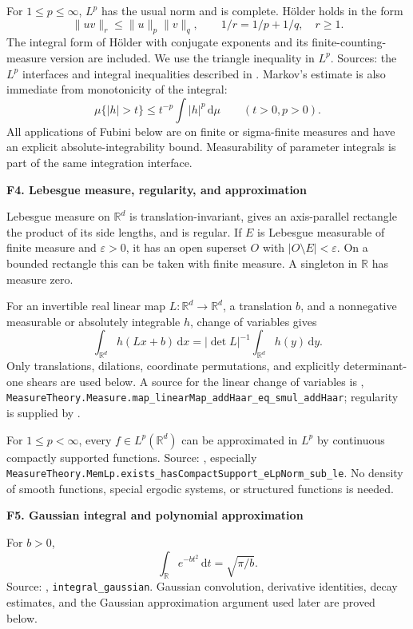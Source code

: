 \documentclass[11pt]{article}
\theoremstyle{remark}\newtheorem{remark}[theorem]{Remark}
\newcommand{\R}{\mathbb R}\newcommand{\C}{\mathbb C}
\newcommand{\dd}{\,\mathrm d}\newcommand{\tr}{\operatorname{tr}}
\newcommand{\lib}[2]{\par\medskip\noindent\textbf{#1. #2}\par}
\begin{document}
For $1\le p\le\infty$, $L^p$ has the usual norm and is complete. H\"older holds in the form
\[
 \|uv\|_r\le\|u\|_p\|v\|_q,\qquad 1/r=1/p+1/q,\quad r\ge1.
\]
The integral form of H\"older with conjugate exponents and its finite-counting-measure version are included. We use the triangle inequality in $L^p$. Sources: the $L^p$ interfaces and integral inequalities described in \cite{ml-lp,ml-mean}. Markov's estimate is also immediate from monotonicity of the integral:
\[
 \mu\{|h|>t\}\le t^{-p}\int|h|^p\dd\mu\qquad(t>0,p>0).
\]
All applications of Fubini below are on finite or sigma-finite measures and have an explicit absolute-integrability bound. Measurability of parameter integrals is part of the same integration interface.

\lib{F4}{Lebesgue measure, regularity, and approximation}
Lebesgue measure on $\R^d$ is translation-invariant, gives an axis-parallel rectangle the product of its side lengths, and is regular. If $E$ is Lebesgue measurable of finite measure and $\varepsilon>0$, it has an open superset $O$ with $|O\setminus E|<\varepsilon$. On a bounded rectangle this can be taken with finite measure. A singleton in $\R$ has measure zero.

For an invertible real linear map $L:\R^d\to\R^d$, a translation $b$, and a nonnegative measurable or absolutely integrable $h$, change of variables gives
\[
 \int_{\R^d}h(Lx+b)\dd x=|\det L|^{-1}\int_{\R^d}h(y)\dd y.
\]
Only translations, dilations, coordinate permutations, and explicitly determinant-one shears are used below. A source for the linear change of variables is \cite{ml-haar}, \texttt{MeasureTheory.\allowbreak Measure.\allowbreak map\_\allowbreak linearMap\_\allowbreak addHaar\_\allowbreak eq\_\allowbreak smul\_\allowbreak addHaar}; regularity is supplied by \cite{ml-regular}.

For $1\le p<\infty$, every $f\in L^p(\R^d)$ can be approximated in $L^p$ by continuous compactly supported functions. Source: \cite{ml-density}, especially \texttt{MeasureTheory.\allowbreak MemLp.\allowbreak exists\_\allowbreak hasCompactSupport\_\allowbreak eLpNorm\_\allowbreak sub\_\allowbreak le}. No density of smooth functions, special ergodic systems, or structured functions is needed.

\lib{F5}{Gaussian integral and polynomial approximation}
For $b>0$,
\[
 \int_{\R}e^{-bt^2}\dd t=\sqrt{\pi/b}.
\]
Source: \cite{ml-gaussian}, \texttt{integral\_\allowbreak gaussian}. Gaussian convolution, derivative identities, decay estimates, and the Gaussian approximation argument used later are proved below.
\end{document}
